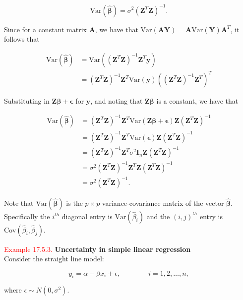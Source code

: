 \documentclass[
]{book}
\begin{document}
\[ \text{Var}(\mathbf{\hat{\beta}}) = \sigma^2 \left( \mathbf{Z}^T \mathbf{Z} \right)^{-1}. \]

Since for a constant matrix \(\mathbf{A}\), we have that \(\text{Var} (\mathbf{A} \mathbf{Y}) = \mathbf{A} \text{Var} ( \mathbf{Y}) \mathbf{A}^T\), it follows that

\begin{align*}
\text{Var}(\mathbf{\hat{\beta}}) &= \text{Var} \left( (\mathbf{Z}^T\mathbf{Z})^{-1} \mathbf{Z}^T \mathbf{y} \right) \\
&= (\mathbf{Z}^T \mathbf{Z})^{-1} \mathbf{Z}^T \text{Var}(\mathbf{y}) \left( (\mathbf{Z}^T \mathbf{Z})^{-1} \mathbf{Z}^T \right)^T 
\end{align*}

Substituting in \(\mathbf{Z}\mathbf{\beta} + \mathbf{\epsilon}\) for \(\mathbf{y}\), and noting that \(\mathbf{Z}\mathbf{\beta}\) is a constant, we have that

\begin{align*}
\text{Var}(\mathbf{\hat{\beta}})  &= (\mathbf{Z}^T \mathbf{Z})^{-1} \mathbf{Z}^T \text{Var}(\mathbf{Z}\mathbf{\beta}+\mathbf{\epsilon})  \mathbf{Z}(\mathbf{Z}^T\mathbf{Z})^{-1} \\
&= (\mathbf{Z}^T \mathbf{Z})^{-1} \mathbf{Z}^T \text{Var}(\mathbf{\epsilon}) \mathbf{Z} (\mathbf{Z}^T\mathbf{Z})^{-1} \\
&= (\mathbf{Z}^T \mathbf{Z})^{-1} \mathbf{Z}^T \sigma^2 \mathbf{I}_n \mathbf{Z} (\mathbf{Z}^T\mathbf{Z})^{-1} \\
&= \sigma^2 (\mathbf{Z}^T \mathbf{Z})^{-1} \mathbf{Z}^T \mathbf{Z} (\mathbf{Z}^T\mathbf{Z})^{-1} \\
&= \sigma^2 (\mathbf{Z}^T \mathbf{Z})^{-1}.
\end{align*}

\hfill\break

Note that \(\text{Var}(\mathbf{\hat{\beta}})\) is the \(p \times p\) variance-covariance matrix of the vector \(\mathbf{\hat{\beta}}\). Specifically the \(i^{th}\) diagonal entry is \(\text{Var}(\hat{\beta}_i)\) and the \((i,j)^{th}\) entry is \(\text{Cov}(\hat{\beta}_i,\hat{\beta}_j)\).

\hypertarget{Sec_Linear_LSE:ex:uncertain}{}
\textcolor{red}{Example 17.5.3.}
{\textbf{Uncertainty in simple linear regression}}\\
Consider the straight line model:

\[ y_i= \alpha + \beta x_i + \epsilon, \qquad \qquad i=1,2,\ldots, n, \]

where \(\epsilon \sim N(0,\sigma^2)\).
\end{document}
